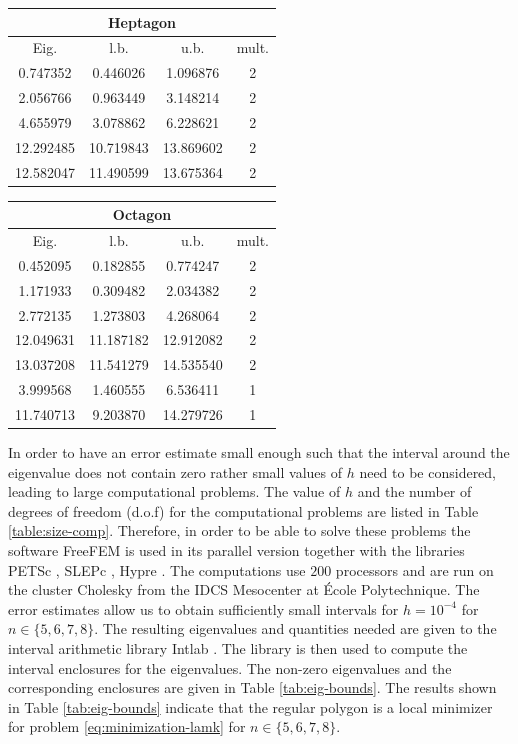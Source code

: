 \documentclass[JEP,XML,SOM,Unicode,ThmDefs,NoFloatCountersInSection,published]{cedram}
\theoremstyle{plain}
\theoremstyle{definition}
\begin{document}
\begin{table}[htb]
\raisebox{12.5pt}
{\begin{minipage}{.49\textwidth}
\begin{tabular}{|c|c|c|c|}
\hline
\multicolumn{4}{|c|}{Heptagon} \\
\hline
Eig. & l.b. & u.b. & mult. \\ \hline
0.747352 & 0.446026 & 1.096876 & 2\\ \hline
2.056766 & 0.963449 & 3.148214 & 2\\ \hline
4.655979 & 3.078862 & 6.228621 & 2\\ \hline
12.292485 & 10.719843 & 13.869602 &2 \\ \hline
12.582047 & 11.490599 & 13.675364 & 2 \\ \hline
\end{tabular}
\end{minipage}}
\begin{minipage}[t]{.49\textwidth}
\begin{tabular}{|c|c|c|c|}
\hline
\multicolumn{4}{|c|}{Octagon} \\
\hline
Eig. & l.b. & u.b. & mult. \\ \hline
0.452095 & 0.182855 & 0.774247 & 2\\ \hline
1.171933 & 0.309482 & 2.034382 & 2\\ \hline
2.772135 & 1.273803 & 4.268064 & 2\\ \hline
12.049631 & 11.187182 & 12.912082 & 2 \\ \hline
13.037208 & 11.541279 & 14.535540 & 2 \\ \hline
3.999568 & 1.460555 & 6.536411 & 1\\ \hline
11.740713 & 9.203870 & 14.279726 & 1 \\ \hline
\end{tabular}
\end{minipage}
\end{table}

In order to have an error estimate small enough such that the interval around the eigenvalue does not contain zero rather small values of $h$ need to be considered, leading to large computational problems. The value of $h$ and the number of degrees of freedom (d.o.f) for the computational problems are listed in Table \ref{table:size-comp}.
Therefore, in order to be able to solve these problems the software FreeFEM \cite{freefem} is used in its parallel version together with the libraries PETSc \cite{petsc}, SLEPc \cite{slepc}, Hypre \cite{hypre}. The computations use $200$ processors and are run on the cluster Cholesky from the IDCS Mesocenter at École Polytechnique. The error estimates allow us to obtain sufficiently small intervals for $h=10^{-4}$ for $n \in \{5,6,7,8\}$. The resulting eigenvalues and quantities needed are given to the interval arithmetic library Intlab \cite{intlab}. The library is then used to compute the interval enclosures for the eigenvalues. The non-zero eigenvalues and the corresponding enclosures are given in Table \ref{tab:eig-bounds}. The results shown in Table \ref{tab:eig-bounds} indicate that the regular polygon is a local minimizer for problem \eqref{eq:minimization-lamk} for $n \in \{5,6,7,8\}$.
\end{document}
